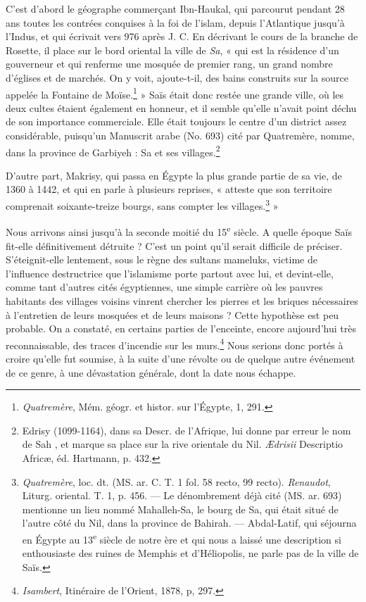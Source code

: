 \documentclass[a4paper, 11pt, oneside]{article}
\begin{document}
C'est d'abord le géographe commerçant Ibn-Haukal, qui parcourut pendant 28 ans toutes les contrées conquises à la foi de l'islam, depuis l'Atlantique jusqu'à l'Indus, et qui écrivait vers 976 après J. C. En décrivant le cours de la branche de Rosette, il place sur le bord oriental la ville de \emph{Sa}, « qui est la résidence d'un gouverneur et qui renferme une mosquée de premier rang, un grand nombre d'églises et de marchés. On y voit, ajoute-t-il, des bains construits sur la source appelée la Fontaine de Moïse.\footnote{\emph{Quatremère}, Mém. géogr. et histor. sur l'Égypte, 1, 291.} » Saïs était donc restée une grande ville, où les deux cultes étaient également en honneur, et il semble qu'elle n'avait point déchu de son importance commerciale. Elle était toujours le centre d'un district assez considérable, puisqu'un Manuscrit arabe (No. 693) cité par Quatremère, nomme, dans la province de Garbiyeh : Sa et ses villages.\footnote{Edrisy (1099-1164), dans sa Descr. de l'Afrique, lui donne par erreur le nom de Sah , et marque sa place sur la rive orientale du Nil. \emph{Ædrisii} Descriptio Africæ, éd. Hartmann, p. 432.}

D'autre part, Makrisy, qui passa en Égypte la plus grande partie de sa vie, de 1360 à 1442, et qui en parle à plusieurs reprises, « atteste que son territoire comprenait soixante-treize bourgs, sans compter les villages.\footnote{\emph{Quatremère}, loc. dt. (MS. ar. C. T. 1 fol. 58 recto, 99 recto). \emph{Renaudot}, Liturg. oriental. T. 1, p. 456. --- Le dénombrement déjà cité (MS. ar. 693) mentionne un lieu nommé Mahalleh-Sa, le bourg de Sa, qui était situé de l'autre côté du Nil, dans la province de Bahirah. --- Abdal-Latif, qui séjourna en Égypte au 13\textsuperscript{e} siècle de notre ère et qui nous a laissé une description si enthousiaste des ruines de Memphis et d'Héliopolis, ne parle pas de la ville de Saïs.} »

Nous arrivons ainsi jusqu'à la seconde moitié du 15\textsuperscript{e} siècle. A quelle époque Saïs fit-elle définitivement détruite ? C'est un point qu'il serait difficile de préciser. S'éteignit-elle lentement, sous le règne des sultans mameluks, victime de l'influence destructrice que l'islamisme porte partout avec lui, et devint-elle, comme tant d'autres cités égyptiennes, une simple carrière où les pauvres habitants des villages voisins vinrent chercher les pierres et les briques nécessaires à l'entretien de leurs mosquées et de leurs maisons ? Cette hypothèse est peu probable. On a constaté, en certains parties de l'enceinte, encore aujourd'hui très reconnaissable, des traces d'incendie sur les murs.\footnote{\emph{Isambert}, Itinéraire de l'Orient, 1878, p, 297.} Nous serions donc portés à croire qu'elle fut soumise, à la suite d'une révolte ou de quelque autre événement de ce genre, à une dévastation générale, dont la date nous échappe.
\end{document}

